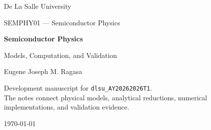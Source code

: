 \begin{titlepage}
  \centering
  \vspace*{18mm}

  {\Large De La Salle University\par}
  \vspace{5mm}
  {\large SEMPHY01 --- Semiconductor Physics\par}

  \vspace{24mm}
  {\Huge\bfseries Semiconductor Physics\par}
  \vspace{4mm}
  {\LARGE Models, Computation, and Validation\par}

  \vspace{20mm}
  {\Large Eugene Joseph M. Ragasa\par}

  \vfill
  \begin{tcolorbox}[
    width=0.82\textwidth,
    colback=SemLightBlue,
    colframe=SemBlue,
    boxrule=0.7pt,
    arc=1mm
  ]
    \centering
    Development manuscript for \texttt{dlsu\_AY20262026T1}.\\[0.4em]
    The notes connect physical models, analytical reductions, numerical
    implementations, and validation evidence.
  \end{tcolorbox}

  \vfill
  {\large \today\par}
\end{titlepage}
